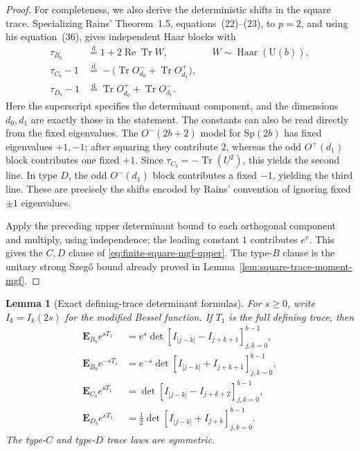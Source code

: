 \documentclass[11pt,reqno]{amsart}
\theoremstyle{plain}
\newtheorem{lemma}[theorem]{Lemma}
\theoremstyle{definition}
\DeclareMathOperator{\Haar}{Haar}
\begin{document}
\begin{proof}
For completeness, we also derive the deterministic shifts in the square
trace.  Specializing Rains' Theorem~1.5, equations~(22)--(23), to $p=2$,
and using his equation~(36), gives independent Haar blocks with
\[
\begin{aligned}
 \tau_{B_b}&\mathrel{\mathop=\limits^{\mathrm d}}
  1+2\operatorname{Re}\operatorname{Tr}W,
  &&W\sim\Haar(\mathrm U(b)),\\
 \tau_{C_b}-1&\mathrel{\mathop=\limits^{\mathrm d}}
  -\bigl(\operatorname{Tr}O^-_{d_0}
        +\operatorname{Tr}O^+_{d_1}\bigr),\\
 \tau_{D_b}-1&\mathrel{\mathop=\limits^{\mathrm d}}
  \operatorname{Tr}O^+_{d_0}
        +\operatorname{Tr}O^-_{d_1}.
\end{aligned}
\]
Here the superscript specifies the determinant component, and the dimensions
$d_0,d_1$ are exactly those in the statement.  The constants can also be
read directly from the fixed eigenvalues.  The $O^-(2b+2)$ model for
$\mathrm{Sp}(2b)$ has fixed eigenvalues $+1,-1$; after squaring they
contribute $2$, whereas the odd $O^+(d_1)$ block contributes one fixed
$+1$.  Since \(\tau_{C_b}=-\operatorname{Tr}(U^2)\), this yields the
second line.  In type $D$, the odd $O^-(d_1)$ block contributes a fixed
$-1$, yielding the third line.  These are precisely the shifts encoded by
Rains' convention of ignoring fixed \(\pm1\) eigenvalues.

Apply the preceding upper determinant bound to each orthogonal component and
multiply, using independence; the leading constant $1$ contributes
$e^v$.  This gives the $C,D$ clause of
\eqref{eq:finite-square-mgf-upper}.  The type-$B$ clause is the unitary strong
Szeg\H{o} bound already proved in Lemma~\ref{lem:square-trace-moment-mgf}.
\end{proof}

\begin{lemma}[Exact defining-trace determinant formulas]
\label{lem:exact-defining-trace-determinants}
For $s\geq0$, write $I_k=I_k(2s)$ for the modified Bessel function.  If
$T_1$ is the full defining trace, then
\begin{align}
 \mathbf E_{B_b}e^{sT_1}
 &=e^s\det[I_{|j-k|}-I_{j+k+1}]_{j,k=0}^{b-1},
 \label{eq:exact-b-positive-mgf}\\
 \mathbf E_{B_b}e^{-sT_1}
 &=e^{-s}\det[I_{|j-k|}+I_{j+k+1}]_{j,k=0}^{b-1},
 \label{eq:exact-b-negative-mgf}\\
 \mathbf E_{C_b}e^{sT_1}
 &=\det[I_{|j-k|}-I_{j+k+2}]_{j,k=0}^{b-1},
 \label{eq:exact-c-mgf}\\
 \mathbf E_{D_b}e^{sT_1}
 &=\frac12\det[I_{|j-k|}+I_{j+k}]_{j,k=0}^{b-1}.
 \label{eq:exact-d-mgf}
\end{align}
The type-$C$ and type-$D$ trace laws are symmetric.
\end{lemma}
\end{document}
